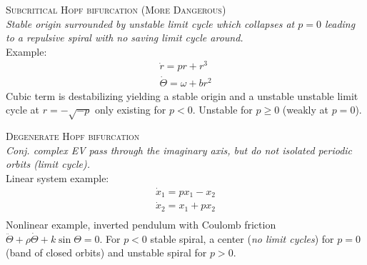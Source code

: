 \textsc{Subcritical Hopf bifurcation (More Dangerous)}\\
\emph{Stable origin surrounded by unstable limit cycle which collapses at $p=0$ leading to a repulsive spiral with no saving limit cycle around.}\\
Example:
\begin{align*}
\dot{r}=pr+r^3\\
\dot{\Theta}=\omega+br^2
\end{align*}
Cubic term is destabilizing yielding a stable origin and a unstable unstable limit cycle at $r=-\sqrt{-p}$ only existing for $p<0$. Unstable for $p\geq 0$ (weakly at $p=0$).
\begin{center}
\end{center}
\vspace{0.2cm}

\textsc{Degenerate Hopf bifurcation}\\
\emph{Conj. complex EV pass through the imaginary axis, but do not isolated periodic orbits (limit cycle).}\\
Linear system example:
\begin{align*}
\dot{x}_1=px_1-x_2\\
\dot{x}_2=x_1+px_2\\
\end{align*}
Nonlinear example, inverted pendulum with Coulomb friction $\ddot{\Theta}+\rho \dot{\Theta} + k\sin \Theta = 0$. For $p<0$ stable spiral, a center (\emph{no limit cycles}) for $p=0$ (band of closed orbits) and unstable spiral for $p>0$.

